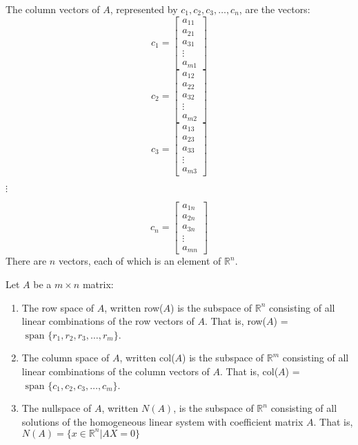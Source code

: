 \documentclass[12pt]{article}
\begin{document}
\begin{definition} The column vectors of $A$, represented by $c_1, c_2, c_3, \dots, c_n$, are the vectors: $$ c_1 = \begin{bmatrix} a_{11} \\ a_{21} \\ a_{31} \\ \vdots \\ a_{m1} \end{bmatrix} $$ $$ c_2 = \begin{bmatrix} a_{12} \\ a_{22} \\ a_{32} \\ \vdots \\ a_{m2} \end{bmatrix} $$ $$ c_3 = \begin{bmatrix} a_{13} \\ a_{23} \\  a_{33} \\ \vdots \\  a_{m3} \end{bmatrix} $$ \begin{center} $\vdots$ \end{center}  $$ c_n = \begin{bmatrix} a_{1n} \\ a_{2n} \\ a_{3n} \\ \vdots \\ a_{mn} \end{bmatrix} $$  There are $n$ vectors, each of which is an element of $\mathbb{R}^n$. \end{definition} 
Let $A$ be a $m \times n$ matrix: \begin{enumerate} 
\item The row space of $A$, written row($A$) is the subspace of $\mathbb{R}^n$ consisting of all linear combinations of the row vectors of $A$. That is, row($A$) = $\text{ span }\{r_1, r_2, r_3, \dots, r_m\}$. 
\item The column space of $A$, written col($A$) is the subspace of $\mathbb{R}^m$ consisting of all linear combinations of the column vectors of $A$. That is, col($A$) = $\text{ span }\{c_1, c_2, c_3, \dots, c_m\}$. 
\item The nullspace of $A$, written $N(A)$, is the subspace of $\mathbb{R}^n$ consisting of all solutions of the homogeneous linear system with coefficient matrix $A$. That is, $N(A) = \{x \in \mathbb{R}^n | AX = 0\}$  \end{enumerate} 
\end{document}
